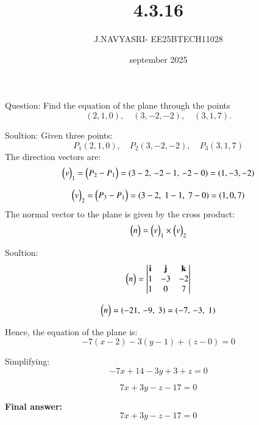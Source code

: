 \documentclass{beamer}
\title %
{4.3.16}
\date{september 2025}
\author %
{J.NAVYASRI- EE25BTECH11028}
\begin{document}
\frame{\titlepage}
\begin{frame}{Question:}
Find the equation of the plane through the points  
\[
(2,1,0), \quad (3,-2,-2), \quad (3,1,7).
\]
\end{frame}

\begin{frame}{Soultion:}
Given three points:
\[
P_1(2,1,0), \quad P_2(3,-2,-2), \quad P_3(3,1,7)
\]
The direction vectors are:
\begin{equation}
\begin{pmatrix}v\end{pmatrix}_1 =\begin{pmatrix}P_2 - P_1\end{pmatrix} = (3-2,\,-2-1,\,-2-0) = (1,-3,-2)
\end{equation}

\begin{equation}
\begin{pmatrix}v\end{pmatrix}_2 =\begin{pmatrix}P_3 - P_1 \end{pmatrix}= (3-2,\;1-1,\;7-0) = (1,0,7)
\end{equation}
The normal vector to the plane is given by the cross product:
\begin{equation}
\begin{pmatrix}n\end{pmatrix} = \begin{pmatrix}v\end{pmatrix}_1 \times \begin{pmatrix}v\end{pmatrix}_2
\end{equation}
\end{frame}

\begin{frame}{Soultion:}
\begin{equation}
\begin{pmatrix}n\end{pmatrix} = 
\begin{vmatrix}
\mathbf{i} & \mathbf{j} & \mathbf{k} \\
1 & -3 & -2 \\
1 & 0 & 7
\end{vmatrix}
\end{equation}

\begin{equation}
\begin{pmatrix}n\end{pmatrix} = (-21,\,-9,\;3) = (-7,\,-3,\;1)
\end{equation}

Hence, the equation of the plane is:
\begin{equation}
-7(x-2) - 3(y-1) + (z-0) = 0
\end{equation}

Simplifying:
\begin{equation}
-7x + 14 - 3y + 3 + z = 0
\end{equation}

\begin{equation}
7x + 3y - z - 17 = 0
\end{equation}

\textbf{Final answer:}
\[
\boxed{7x + 3y - z - 17 = 0}
\]
\end{frame}
\end{document}
